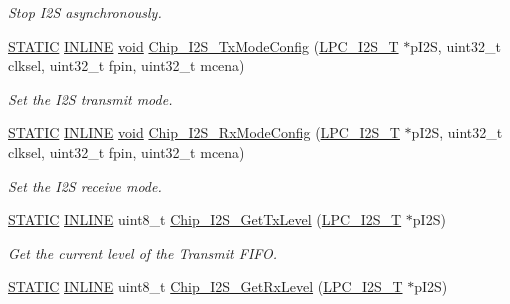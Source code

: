 \begin{DoxyCompactItemize}
\begin{DoxyCompactList}\small\item\em Stop I2\-S asynchronously. \end{DoxyCompactList}\item 
\hyperlink{group__LPC__Types__Public__Macros_ga10b2d890d871e1489bb02b7e70d9bdfb}{S\-T\-A\-T\-I\-C} \hyperlink{group__LPC__Types__Public__Types_ga2eb6f9e0395b47b8d5e3eeae4fe0c116}{I\-N\-L\-I\-N\-E} \hyperlink{Paradigm_2Tern__EE_2small_2portmacro_8h_a14d32f8130d3c0b212cfc751730b5b49}{void} \hyperlink{group__I2S__17XX__40XX_ga0c7a808e84e2c0a3f7ffbba089c7d380}{Chip\-\_\-\-I2\-S\-\_\-\-Tx\-Mode\-Config} (\hyperlink{structLPC__I2S__T}{L\-P\-C\-\_\-\-I2\-S\-\_\-\-T} $\ast$p\-I2\-S, uint32\-\_\-t clksel, uint32\-\_\-t fpin, uint32\-\_\-t mcena)
\begin{DoxyCompactList}\small\item\em Set the I2\-S transmit mode. \end{DoxyCompactList}\item 
\hyperlink{group__LPC__Types__Public__Macros_ga10b2d890d871e1489bb02b7e70d9bdfb}{S\-T\-A\-T\-I\-C} \hyperlink{group__LPC__Types__Public__Types_ga2eb6f9e0395b47b8d5e3eeae4fe0c116}{I\-N\-L\-I\-N\-E} \hyperlink{Paradigm_2Tern__EE_2small_2portmacro_8h_a14d32f8130d3c0b212cfc751730b5b49}{void} \hyperlink{group__I2S__17XX__40XX_gae4e5e39c6ea22b2be42c91bdaa0f27e8}{Chip\-\_\-\-I2\-S\-\_\-\-Rx\-Mode\-Config} (\hyperlink{structLPC__I2S__T}{L\-P\-C\-\_\-\-I2\-S\-\_\-\-T} $\ast$p\-I2\-S, uint32\-\_\-t clksel, uint32\-\_\-t fpin, uint32\-\_\-t mcena)
\begin{DoxyCompactList}\small\item\em Set the I2\-S receive mode. \end{DoxyCompactList}\item 
\hyperlink{group__LPC__Types__Public__Macros_ga10b2d890d871e1489bb02b7e70d9bdfb}{S\-T\-A\-T\-I\-C} \hyperlink{group__LPC__Types__Public__Types_ga2eb6f9e0395b47b8d5e3eeae4fe0c116}{I\-N\-L\-I\-N\-E} uint8\-\_\-t \hyperlink{group__I2S__17XX__40XX_ga125559c7f810a2564f5b6059ead42256}{Chip\-\_\-\-I2\-S\-\_\-\-Get\-Tx\-Level} (\hyperlink{structLPC__I2S__T}{L\-P\-C\-\_\-\-I2\-S\-\_\-\-T} $\ast$p\-I2\-S)
\begin{DoxyCompactList}\small\item\em Get the current level of the Transmit F\-I\-F\-O. \end{DoxyCompactList}\item 
\hyperlink{group__LPC__Types__Public__Macros_ga10b2d890d871e1489bb02b7e70d9bdfb}{S\-T\-A\-T\-I\-C} \hyperlink{group__LPC__Types__Public__Types_ga2eb6f9e0395b47b8d5e3eeae4fe0c116}{I\-N\-L\-I\-N\-E} uint8\-\_\-t \hyperlink{group__I2S__17XX__40XX_ga5880b341bea64ea33e734af422b43dc3}{Chip\-\_\-\-I2\-S\-\_\-\-Get\-Rx\-Level} (\hyperlink{structLPC__I2S__T}{L\-P\-C\-\_\-\-I2\-S\-\_\-\-T} $\ast$p\-I2\-S)

\end{DoxyCompactItemize}
